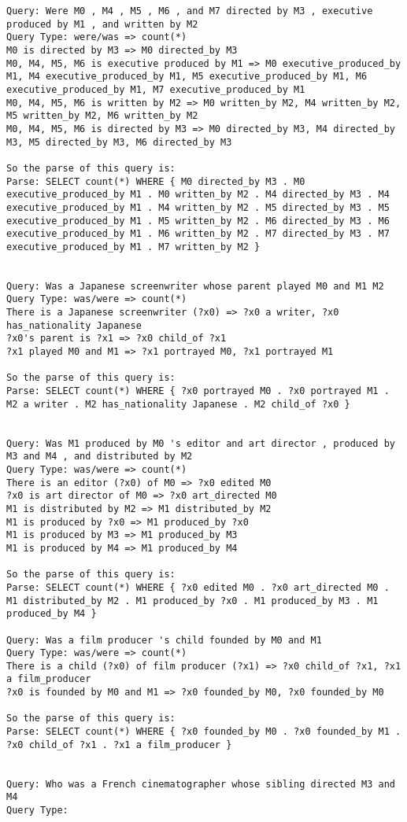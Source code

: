 \documentclass{article} \usepackage{iclr2022_conference,times}
\begin{document}
\begin{lstlisting}
Query: Were M0 , M4 , M5 , M6 , and M7 directed by M3 , executive produced by M1 , and written by M2
Query Type: were/was => count(*)
M0 is directed by M3 => M0 directed_by M3
M0, M4, M5, M6 is executive produced by M1 => M0 executive_produced_by M1, M4 executive_produced_by M1, M5 executive_produced_by M1, M6 executive_produced_by M1, M7 executive_produced_by M1
M0, M4, M5, M6 is written by M2 => M0 written_by M2, M4 written_by M2, M5 written_by M2, M6 written_by M2
M0, M4, M5, M6 is directed by M3 => M0 directed_by M3, M4 directed_by M3, M5 directed_by M3, M6 directed_by M3

So the parse of this query is:
Parse: SELECT count(*) WHERE { M0 directed_by M3 . M0 executive_produced_by M1 . M0 written_by M2 . M4 directed_by M3 . M4 executive_produced_by M1 . M4 written_by M2 . M5 directed_by M3 . M5 executive_produced_by M1 . M5 written_by M2 . M6 directed_by M3 . M6 executive_produced_by M1 . M6 written_by M2 . M7 directed_by M3 . M7 executive_produced_by M1 . M7 written_by M2 }


Query: Was a Japanese screenwriter whose parent played M0 and M1 M2
Query Type: was/were => count(*)
There is a Japanese screenwriter (?x0) => ?x0 a writer, ?x0 has_nationality Japanese
?x0's parent is ?x1 => ?x0 child_of ?x1
?x1 played M0 and M1 => ?x1 portrayed M0, ?x1 portrayed M1

So the parse of this query is:
Parse: SELECT count(*) WHERE { ?x0 portrayed M0 . ?x0 portrayed M1 . M2 a writer . M2 has_nationality Japanese . M2 child_of ?x0 }


Query: Was M1 produced by M0 's editor and art director , produced by M3 and M4 , and distributed by M2
Query Type: was/were => count(*)
There is an editor (?x0) of M0 => ?x0 edited M0
?x0 is art director of M0 => ?x0 art_directed M0
M1 is distributed by M2 => M1 distributed_by M2
M1 is produced by ?x0 => M1 produced_by ?x0
M1 is produced by M3 => M1 produced_by M3
M1 is produced by M4 => M1 produced_by M4

So the parse of this query is:
Parse: SELECT count(*) WHERE { ?x0 edited M0 . ?x0 art_directed M0 . M1 distributed_by M2 . M1 produced_by ?x0 . M1 produced_by M3 . M1 produced_by M4 }

Query: Was a film producer 's child founded by M0 and M1
Query Type: was/were => count(*)
There is a child (?x0) of film producer (?x1) => ?x0 child_of ?x1, ?x1 a film_producer
?x0 is founded by M0 and M1 => ?x0 founded_by M0, ?x0 founded_by M0

So the parse of this query is:
Parse: SELECT count(*) WHERE { ?x0 founded_by M0 . ?x0 founded_by M1 . ?x0 child_of ?x1 . ?x1 a film_producer }


Query: Who was a French cinematographer whose sibling directed M3 and M4
Query Type:
\end{lstlisting}
\end{document}
